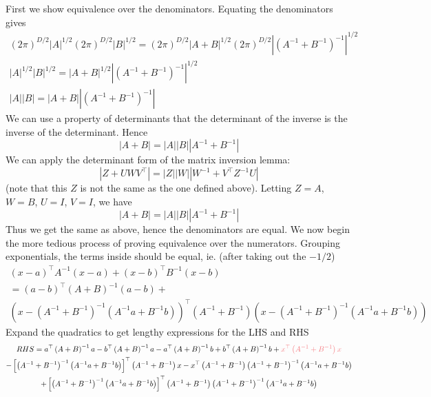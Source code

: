 \documentclass[11pt]{report} %
\begin{document}
First we show equivalence over the denominators. Equating the denominators gives
\begin{gather}
\left(2\pi\right)^{D/2}\left|A\right|^{1/2}\left(2\pi\right)^{D/2}\left|B\right|^{1/2}=\left(2\pi\right)^{D/2}\left|A+B\right|^{1/2}\left(2\pi\right)^{D/2}\left|\left(A^{-1}+B^{-1}\right)^{-1}\right|^{1/2} \\
\left|A\right|^{1/2}\left|B\right|^{1/2}=\left|A+B\right|^{1/2}\left|\left(A^{-1}+B^{-1}\right)^{-1}\right|^{1/2} \\
\left|A\right|\left|B\right|=\left|A+B\right|\left|\left(A^{-1}+B^{-1}\right)^{-1}\right|
\end{gather}
We can use a property of determinants that the determinant of the inverse is the inverse of the determinant. Hence
\begin{equation}
\left|A+B\right|=\left|A\right|\left|B\right|\left|A^{-1}+B^{-1}\right|
\end{equation}
We can apply the determinant form of the matrix inversion lemma:
\begin{equation}
\left|Z+UWV^{\top}\right|=\left|Z\right|\left|W\right|\left|W^{-1}+V^{\top}Z^{-1}U\right|
\end{equation}
(note that this $Z$ is not the same as the one defined above). Letting $Z = A$, $W = B$, $U = I$, $V = I$, we have
\begin{equation}
\left|A+B\right|=\left|A\right|\left|B\right|\left|A^{-1}+B^{-1}\right|
\end{equation}
Thus we get the same as above, hence the denominators are equal. We now begin the more tedious process of proving equivalence over the numerators. Grouping exponentials, the terms inside should be equal, ie. (after taking out the $-1/2$)
\begin{multline}
\left(x-a\right)^{\top}A^{-1}\left(x-a\right)+\left(x-b\right)^{\top}B^{-1}\left(x-b\right) \\
=\left(a-b\right)^{\top}\left(A+B\right)^{-1}\left(a-b\right)+ \\
\left(x-\left(A^{-1}+B^{-1}\right)^{-1}\left(A^{-1}a+B^{-1}b\right)\right)^{\top}\left(A^{-1}+B^{-1}\right)\left(x-\left(A^{-1}+B^{-1}\right)^{-1}\left(A^{-1}a+B^{-1}b\right)\right)
\end{multline}
Expand the quadratics to get lengthy expressions for the LHS and RHS
\begin{multline}
RHS = a^{\top}\left(A+B\right)^{-1}a-b^{\top}\left(A+B\right)^{-1}a-a^{\top}\left(A+B\right)^{-1}b+b^{\top}\left(A+B\right)^{-1}b+ \red x^{\top}\left(A^{-1}+B^{-1}\right)x\black \\
-\left[\left(A^{-1}+B^{-1}\right)^{-1}\left(A^{-1}a+B^{-1}b\right)\right]^{\top}\left(A^{-1}+B^{-1}\right)x-x^{\top}\left(A^{-1}+B^{-1}\right)\left(A^{-1}+B^{-1}\right)^{-1}\left(A^{-1}a+B^{-1}b\right) \\
+\left[\left(A^{-1}+B^{-1}\right)^{-1}\left(A^{-1}a+B^{-1}b\right)\right]^{\top}\left(A^{-1}+B^{-1}\right)\left(A^{-1}+B^{-1}\right)^{-1}\left(A^{-1}a+B^{-1}b\right)
\end{multline}
\end{document}
